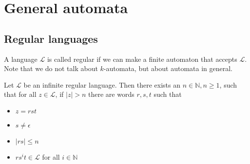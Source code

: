 \documentclass{article}
\begin{document}
\section{General automata}
\subsection{Regular languages}
A language $\mathcal{L}$ is called regular if we can make a finite automaton
that accepts $\mathcal{L}$. Note that we do not talk about $k$-automata, but
about automata in general.

\begin{lemma} \label{lem:pump}
Let $\mathcal{L}$ be an infinite regular language. Then there exists an 
$n \in \mathbb{N}, n \ge 1$, such that for all $z \in \mathcal{L}$, if 
$|z| > n$ there are words $r, s, t$ such that
\begin{itemize}
\item $z = rst$
\item $s \ne \epsilon$
\item $|rs| \le n$
\item $r s^i t \in \mathcal{L}$ for all $i \in \mathbb{N}$ 
\end{itemize}
\end{lemma}
\end{document}
